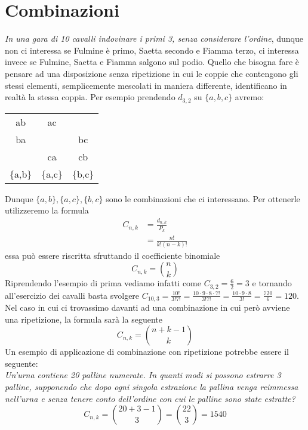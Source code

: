\documentclass[11pt]{report}
\begin{document}
\section{Combinazioni}
\textit{In una gara di 10 cavalli indovinare i primi 3, senza considerare l'ordine}, dunque non ci interessa se Fulmine è primo, Saetta secondo e Fiamma terzo, ci interessa invece se Fulmine, Saetta e Fiamma salgono sul podio. Quello che bisogna fare è pensare ad una disposizione senza ripetizione in cui le coppie che contengono gli stessi elementi, semplicemente mescolati in maniera differente, identificano in realtà la stessa coppia. Per esempio prendendo $d_{3,2}$ su $\{a,b,c\}$ avremo:
\begin{center}
\begin{tabular}{ c c c }
ab & ac &    \\
ba &    & bc \\
   & ca & cb \\
\hline
\{a,b\} & \{a,c\} & \{b,c\}
\end{tabular}
\end{center}
Dunque $\{a,b\}, \{a,c\}, \{b,c\}$ sono le combinazioni che ci interessano. Per ottenerle utilizzeremo la formula
\begin{equation}
    \begin{split}
        C_{n,k} & = \frac{d_{n,k}}{P_k}\\
        & = \frac{n!}{k!(n-k)!}
    \end{split}
\end{equation}
essa può essere riscritta sfruttando il coefficiente binomiale
\begin{equation}
    C_{n,k} = \binom{n}{k}
\end{equation}
Riprendendo l'esempio di prima vediamo infatti come $C_{3,2} = \frac{6}{2} = 3$ e tornando all'esercizio dei cavalli basta svolgere $C_{10,3} = \frac{10!}{3!7!} = \frac{10 \cdot 9 \cdot 8 \cdot 7!}{3!7!} = \frac{10 \cdot 9 \cdot 8}{3!} = \frac{720}{6} = 120$.\\
Nel caso in cui ci trovassimo davanti ad una combinazione in cui però avviene una ripetizione, la formula sarà la seguente
\begin{equation}
    C_{n,k} = \binom{n+k-1}{k}
\end{equation}
Un esempio di applicazione di combinazione con ripetizione potrebbe essere il seguente:\\
\textit{Un'urna contiene 20 palline numerate. In quanti modi si possono estrarre 3 palline, supponendo che dopo ogni singola estrazione la pallina venga reimmessa nell'urna e senza tenere conto dell'ordine con cui le palline sono state estratte?}
\begin{equation}
    C_{n,k} = \binom{20+3-1}{3} = \binom{22}{3} = 1540
\end{equation}
\end{document}
